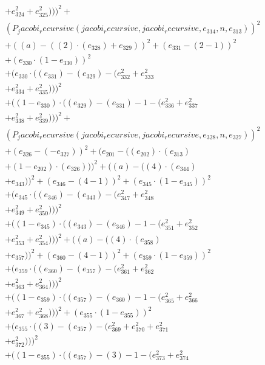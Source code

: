 \documentclass[10pt, a4paper]{article}
\begin{document}
\begin{small}
\begin{align*}
& + e_{324}^{2} + e_{325}^{2})))^{2} + \\
& (P_jacobi_recursive(jacobi_recursive, jacobi_recursive, e_{314}, n, e_{313}))^{2} \\
& + ((a) - ((2)  \cdot  (e_{328}) + e_{329}))^{2} + (e_{331} - (2 - 1))^{2} \\
& + (e_{330}  \cdot  (1 - e_{330}))^{2} \\
& + (e_{330}  \cdot  ((e_{331}) - (e_{329}) - (e_{332}^{2} + e_{333}^{2} \\
& + e_{334}^{2} + e_{335}^{2})))^{2} \\
& + ((1 - e_{330})  \cdot  ((e_{329}) - (e_{331}) - 1 - (e_{336}^{2} + e_{337}^{2} \\
& + e_{338}^{2} + e_{339}^{2})))^{2} + \\
& (P_jacobi_recursive(jacobi_recursive, jacobi_recursive, e_{328}, n, e_{327}))^{2} \\
& + (e_{326} - (-e_{327}))^{2} + (e_{201} - ((e_{202})  \cdot  (e_{313}) \\
& + (1 - e_{202})  \cdot  (e_{326})))^{2} + ((a) - ((4)  \cdot  (e_{344}) \\
& + e_{343}))^{2} + (e_{346} - (4 - 1))^{2} + (e_{345}  \cdot  (1 - e_{345}))^{2} \\
& + (e_{345}  \cdot  ((e_{346}) - (e_{343}) - (e_{347}^{2} + e_{348}^{2} \\
& + e_{349}^{2} + e_{350}^{2})))^{2} \\
& + ((1 - e_{345})  \cdot  ((e_{343}) - (e_{346}) - 1 - (e_{351}^{2} + e_{352}^{2} \\
& + e_{353}^{2} + e_{354}^{2})))^{2} + ((a) - ((4)  \cdot  (e_{358}) \\
& + e_{357}))^{2} + (e_{360} - (4 - 1))^{2} + (e_{359}  \cdot  (1 - e_{359}))^{2} \\
& + (e_{359}  \cdot  ((e_{360}) - (e_{357}) - (e_{361}^{2} + e_{362}^{2} \\
& + e_{363}^{2} + e_{364}^{2})))^{2} \\
& + ((1 - e_{359})  \cdot  ((e_{357}) - (e_{360}) - 1 - (e_{365}^{2} + e_{366}^{2} \\
& + e_{367}^{2} + e_{368}^{2})))^{2} + (e_{355}  \cdot  (1 - e_{355}))^{2} \\
& + (e_{355}  \cdot  ((3) - (e_{357}) - (e_{369}^{2} + e_{370}^{2} + e_{371}^{2} \\
& + e_{372}^{2})))^{2} \\
& + ((1 - e_{355})  \cdot  ((e_{357}) - (3) - 1 - (e_{373}^{2} + e_{374}^{2} \\

\end{align*}
\end{small}
\end{document}
